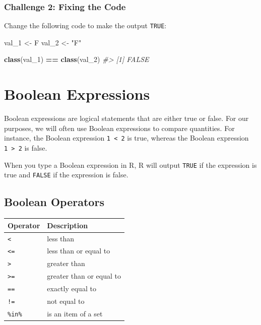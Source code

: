 \documentclass[
]{book}
\newenvironment{Shaded}{\begin{snugshade}}{\end{snugshade}}
\newcommand{\CommentTok}[1]{\textcolor[rgb]{0.56,0.35,0.01}{\textit{#1}}}
\newcommand{\DecValTok}[1]{\textcolor[rgb]{0.00,0.00,0.81}{#1}}
\newcommand{\KeywordTok}[1]{\textcolor[rgb]{0.13,0.29,0.53}{\textbf{#1}}}
\newcommand{\NormalTok}[1]{#1}
\newcommand{\OperatorTok}[1]{\textcolor[rgb]{0.81,0.36,0.00}{\textbf{#1}}}
\newcommand{\StringTok}[1]{\textcolor[rgb]{0.31,0.60,0.02}{#1}}
\begin{document}
\hypertarget{challenge-2-fixing-the-code}{%
\subsubsection*{Challenge 2: Fixing the Code}\label{challenge-2-fixing-the-code}}

Change the following code to make the output \texttt{TRUE}:

\begin{Shaded}
\begin{Highlighting}[]
\NormalTok{val_}\DecValTok{1}\NormalTok{ <-}\StringTok{ }\NormalTok{F}
\NormalTok{val_}\DecValTok{2}\NormalTok{ <-}\StringTok{ "F"}

\KeywordTok{class}\NormalTok{(val_}\DecValTok{1}\NormalTok{) }\OperatorTok{==}\StringTok{ }\KeywordTok{class}\NormalTok{(val_}\DecValTok{2}\NormalTok{)}
\CommentTok{#> [1] FALSE}
\end{Highlighting}
\end{Shaded}

\hypertarget{boolean-expressions}{%
\section{Boolean Expressions}\label{boolean-expressions}}

Boolean expressions are logical statements that are either true or false. For our purposes, we will often use Boolean expressions to compare quantities. For instance, the Boolean expression \texttt{1\ \textless{}\ 2} is true, whereas the Boolean expression \texttt{1\ \textgreater{}\ 2} is false.

When you type a Boolean expression in R, R will output \texttt{TRUE} if the expression is true and \texttt{FALSE} if the expression is false.

\hypertarget{boolean-operators}{%
\subsection{Boolean Operators}\label{boolean-operators}}

\begin{longtable}[]{@{}ll@{}}
\toprule
Operator & Description\tabularnewline
\midrule
\endhead
\texttt{\textless{}} & less than\tabularnewline
\texttt{\textless{}=} & less than or equal to\tabularnewline
\texttt{\textgreater{}} & greater than\tabularnewline
\texttt{\textgreater{}=} & greater than or equal to\tabularnewline
\texttt{==} & exactly equal to\tabularnewline
\texttt{!=} & not equal to\tabularnewline
\texttt{\%in\%} & is an item of a set\tabularnewline
\bottomrule
\end{longtable}
\end{document}
